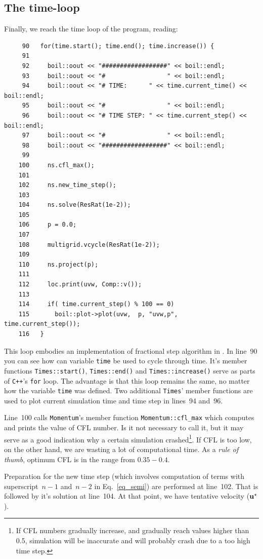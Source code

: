 \subsection{The time-loop}

Finally, we reach the time loop of the program, reading:
%
{\small \begin{verbatim}
     90   for(time.start(); time.end(); time.increase()) {
     91
     92     boil::oout << "##################" << boil::endl;
     93     boil::oout << "#                 " << boil::endl;
     94     boil::oout << "# TIME:      " << time.current_time() << boil::endl;
     95     boil::oout << "#                 " << boil::endl;
     96     boil::oout << "# TIME STEP: " << time.current_step() << boil::endl;
     97     boil::oout << "#                 " << boil::endl;
     98     boil::oout << "##################" << boil::endl;
     99
    100     ns.cfl_max();
    101
    102     ns.new_time_step();
    103
    104     ns.solve(ResRat(1e-2));
    105
    106     p = 0.0;
    107
    108     multigrid.vcycle(ResRat(1e-2));
    109
    110     ns.project(p);
    111
    112     loc.print(uvw, Comp::v());
    113
    114     if( time.current_step() % 100 == 0)
    115       boil::plot->plot(uvw,  p, "uvw,p",  time.current_step());
    116   }
\end{verbatim}}
%
This loop embodies an implementation of fractional step algorithm in {\psiboil}.
In line~90 you can see how can variable {\tt time} be used to cycle through time.
It's member functions {\tt Times::start()}, {\tt Times::end()} and {\tt Times::increase()}
serve as parts of {\tt C++}'s {\tt for} loop. The advantage is that this loop 
remains the same, no matter how the variable {\tt time} was defined. 
Two additional {\tt Times}' member functions are used to plot current simulation
time and time step in lines~94 and~96. 

Line~100 calls {\tt Momentum}'s member function {\tt Momentum::cfl\_max} which computes
and prints the value of CFL number. Is it not necessary to call it, but it may serve
as a good indication why a certain simulation crashed\footnote{If CFL numbers gradually
increase, and gradually reach values higher than 0.5, simulation will be inaccurate
and will probably crash due to a too high time step.}. If CFL is too low, on the
other hand, we are wasting a lot of computational time. As a {\em rule of thumb}, optimum
CFL is in the range from $0.35 - 0.4$. 

Preparation for the new time step (which involves computation of terms with 
superscript~$n-1$ and~$n-2$ in Eq.~\ref{eq_semi}) are performed at line~102. That
is followed by it's solution at line~104. At that point, we have tentative 
velocity (${\bf u}^\star$). 

